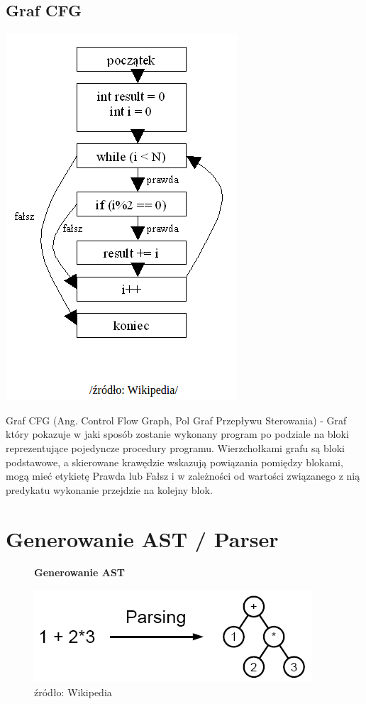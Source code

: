 \documentclass[a4paper,twoside,openright,11pt]{report}
\begin{document}
  \subsection {Graf CFG}
\begin{center}
  \includegraphics[scale=0.5]{cfg}
\end{center}
  
\par Graf CFG (Ang. Control Flow Graph, Pol Graf Przepływu Sterowania) - Graf który pokazuje w jaki sposób zostanie wykonany program po podziale na bloki reprezentujące pojedyncze procedury programu. Wierzchołkami grafu są bloki podstawowe, a skierowane krawędzie wskazują powiązania pomiędzy blokami, mogą mieć etykietę Prawda lub Fałsz i w zależności od wartości związanego z nią predykatu wykonanie przejdzie na kolejny blok.



  \section {Generowanie AST / Parser}

\begin{figure}[H]
  \centering
  \textbf{Generowanie AST}\par\medskip
  \includegraphics[scale=0.7]{parsing}
  \caption{źródło: Wikipedia}
\end{figure}
\end{document}
